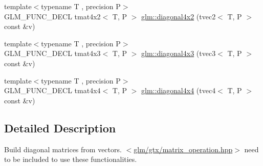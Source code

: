 \begin{DoxyCompactItemize}
\item 
{\footnotesize template$<$typename T , precision P$>$ }\\G\-L\-M\-\_\-\-F\-U\-N\-C\-\_\-\-D\-E\-C\-L tmat4x2$<$ T, P $>$ \hyperlink{group__gtx__matrix__operation_ga70cc5632aa9f41e7cf0b81fee6f2bfe6}{glm\-::diagonal4x2} (tvec2$<$ T, P $>$ const \&v)
\item 
{\footnotesize template$<$typename T , precision P$>$ }\\G\-L\-M\-\_\-\-F\-U\-N\-C\-\_\-\-D\-E\-C\-L tmat4x3$<$ T, P $>$ \hyperlink{group__gtx__matrix__operation_ga4242ea5681f81539e0c5b54fadcd9ddf}{glm\-::diagonal4x3} (tvec3$<$ T, P $>$ const \&v)
\item 
{\footnotesize template$<$typename T , precision P$>$ }\\G\-L\-M\-\_\-\-F\-U\-N\-C\-\_\-\-D\-E\-C\-L tmat4x4$<$ T, P $>$ \hyperlink{group__gtx__matrix__operation_gade576e044d8e52f343166f665589d782}{glm\-::diagonal4x4} (tvec4$<$ T, P $>$ const \&v)
\end{DoxyCompactItemize}


\subsection{Detailed Description}
Build diagonal matrices from vectors. $<$\hyperlink{matrix__operation_8hpp}{glm/gtx/matrix\-\_\-operation.\-hpp}$>$ need to be included to use these functionalities. 

